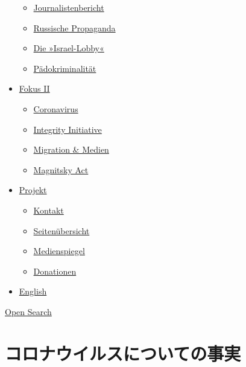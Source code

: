 \begin{itemize}
  \begin{itemize}
  \tightlist
  \item
    \href{https://swprs.org/bericht-eines-journalisten/}{Journalistenbericht}
  \item
    \href{https://swprs.org/russische-propaganda/}{Russische Propaganda}
  \item
    \href{https://swprs.org/die-israel-lobby-fakten-und-mythen/}{Die
    »Israel-Lobby«}
  \item
    \href{https://swprs.org/geopolitik-und-paedokriminalitaet/}{Pädokriminalität}
  \end{itemize}
\item
  \href{https://swprs.org/migration-und-medien/}{Fokus II}

  \begin{itemize}
  \tightlist
  \item
    \href{https://swprs.org/covid-19-hinweis-ii/}{Coronavirus}
  \item
    \href{https://swprs.org/die-integrity-initiative/}{Integrity
    Initiative}
  \item
    \href{https://swprs.org/migration-und-medien/}{Migration \& Medien}
  \item
    \href{https://swprs.org/der-fall-magnitsky/}{Magnitsky Act}
  \end{itemize}
\item
  \href{https://swprs.org/kontakt/}{Projekt}

  \begin{itemize}
  \tightlist
  \item
    \href{https://swprs.org/kontakt/}{Kontakt}
  \item
    \href{https://swprs.org/uebersicht/}{Seitenübersicht}
  \item
    \href{https://swprs.org/medienspiegel/}{Medienspiegel}
  \item
    \href{https://swprs.org/donationen/}{Donationen}
  \end{itemize}
\item
  \href{https://swprs.org/contact/}{English}
\end{itemize}

\protect\hyperlink{}{Open Search}

\hypertarget{ux30b3ux30edux30caux30a6ux30a4ux30ebux30b9ux306bux3064ux3044ux3066ux306eux4e8bux5b9f}{%
\section{コロナウイルスについての事実}\label{ux30b3ux30edux30caux30a6ux30a4ux30ebux30b9ux306bux3064ux3044ux3066ux306eux4e8bux5b9f}}

